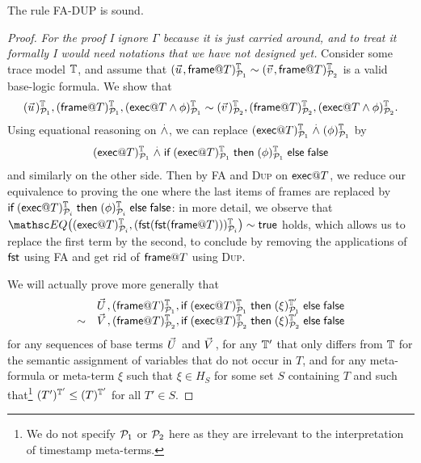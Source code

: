 \begin{proposition}
  The rule \textsc{FA-DUP} is sound.
\end{proposition}
\begin{proof}
  \emph{For the proof I ignore $\Gamma$ because it is just carried around,
  and to treat it formally I would need notations that we have not designed
  yet.}
  Consider some trace model $\mathbb{T}$,
  and assume that
  $(\pvec u,\mframe @ T)^\TM_{\calp_1} \sim
   (\pvec v,\mframe @ T)^\TM_{\calp_2}$
  is a valid base-logic formula.
  We show that
  $$
  \interp{\pvec u}{\TM}{\calp_1},
  \interp{\mframe @ T}{\TM}{\calp_1},
  (\mexec @ T \wedge \phi)^\TM_{\calp_1}
  \sim
  \interp{\pvec v}{\TM}{\calp_2},
  \interp{\mframe @ T}{\TM}{\calp_2},
  (\mexec @ T \wedge \phi)^\TM_{\calp_2}.
  $$
  Using equational reasoning on $\stackrel{.}{\wedge}$, we can replace
  $(\textsf{exec} @ T)^{\mathbb{T}}_{\mathcal{P}_1} \stackrel{.}{\wedge} (\phi)^{\mathbb{T}}_{\mathcal{P}_1}$ by
  $$(\textsf{exec} @ T)^{\mathbb{T}}_{\mathcal{P}_1} \stackrel{.}{\wedge}
  \textsf{if}\; (\textsf{exec} @ T)^{\mathbb{T}}_{\mathcal{P}_1}
  \;\textsf{then}\; (\phi)^{\mathbb{T}}_{\mathcal{P}_1} \;\textsf{else}\; \textsf{false}$$
  and similarly on the other side.
  Then by \textsc{FA} and \textsc{Dup} on $\textsf{exec} @ T$,
  we reduce our equivalence to proving the one where the last items
  of frames are replaced by
  $
  \textsf{if}\; (\textsf{exec} @ T)^{\mathbb{T}}_{\mathcal{P}_i}
  \;\textsf{then}\; (\phi)^{\mathbb{T}}_{\mathcal{P}_i} \;\textsf{else}\; \textsf{false}
  $:
  in more detail, we observe that
  $\EQ\bigl(\interp{\mexec @ T}{\TM}{\calp_i},
       \interp{\fst(\fst(\mframe @ T))}{\TM}{\calp_i}\bigr)\sim\true$
  holds, which allows us to replace the first term by the second,
  to conclude by removing the applications of $\mathsf{fst}$ using \textsc{FA}
  and get rid of $\textsf{frame} @ T$ using \textsc{Dup}.

  We will actually prove more generally that
  $$
  \begin{array}{rl}
    &
    \pvec U,
    \interp{\mframe @ T}{\TM}{\calp_1},
    \myif \interp{\mexec @ T}{\TM}{\calp_1}
    \mythen \interp{\xi}{\TM'}{\calp_1} \myelse \false
    \\ \sim &
    \pvec V,
    \interp{\mframe @ T}{\TM}{\calp_2},
    \myif \interp{\mexec @ T}{\TM}{\calp_2}
    \mythen \interp{\xi}{\TM'}{\calp_2} \myelse \false
  \end{array}
  $$
  for any sequences of base terms $\pvec U$ and $\pvec V$,
  for any $\mathbb{T}'$ that only differs from $\mathbb{T}$ for the semantic
  assignment of variables that do not occur in $T$,
  and for any meta-formula or meta-term $\xi$ such that $\xi \in H_S$
  for some set $S$ containing $T$ and such that\footnote{
    We do not specify $\mathcal{P}_1$ or $\mathcal{P}_2$ here
    as they are irrelevant to the interpretation of timestamp meta-terms.
  } $(T')^{\mathbb{T}'}_{}\leq(T)^{\mathbb{T}'}_{}$ for all $T'\in S$.


\end{proof}
